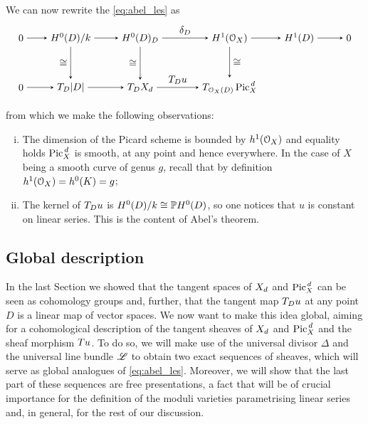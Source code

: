 		We can now rewrite the \les \eqref{eq:abel_les} as
		\begin{equation}\label{eq:local_diagram}
		\begin{tikzpicture}[node distance=5em, auto]
			\node (O) 									{$0$};
			\node (A) 	[right of=O]		{$H^0(D)/k$};
			\node (B) 	[right of=A, xshift=2em]		{$H^0(D)_D$};
		  \node (C) 	[right of=B, xshift=4em] 		{$H^1(\OX)$};
		  \node (D) 	[right of=C, xshift=2em] 		{$H^1(D)$};
		  \node (OO) 	[right of=D] 		{$0$};
		  \node (O') 	[below of=O] 		{$0$};
			\node (A') 	[below of=A] 		{$ T_D |D|$};
		  \node (B') 	[below of=B] 		{$ T_D \Dd$};
		  \node (C') 	[below of=C] 		{$ T_{\OXD} \Pd $};
		  \node (D') 	[below of=D] 		{$\;$};
			\draw[-stealth] 				(O)		to node {} (A);
		  \draw[-stealth]					(A)		to node {} (B);
		  \draw[-stealth]					(B)		to node {$\delta_D$} (C);
		  \draw[-stealth]					(C)		to node {} (D);
			\draw[-stealth]					(D)		to node {} (OO);
			\draw[-stealth] 				(O')	to node {} (A');
		  \draw[-stealth]					(A')	to node {} (B');	  
		  \draw[-stealth]					(B')	to node {$T_D u$} (C');
		  \draw[-stealth][swap]		(A)		to node {$\cong$} (A');
		  \draw[-stealth][swap]		(B)		to node {$\cong$} (B');
		  \draw[-stealth]					(C)		to node {$\cong$} (C');
		\end{tikzpicture}
		\end{equation}	
		from which we make the following observations:
		\begin{enumerate}[i)]
			\item The dimension of the Picard scheme is bounded by $h^1(\mathcal{O}_X)$ and equality holds \ABiff $ \operatorname{Pic}^{\,d}_X$ is smooth, at any point and hence everywhere. In the case of $X$ being a smooth curve of genus $g$, recall that by definition $h^1(\mathcal{O}_X)=h^0(K)=g$;
			\item The kernel of $T_D u$ is $H^0(D)/k \cong \mathbb{P} H^0(D)$, so one notices that $u$ is constant on linear series. This is the content of Abel's theorem.
		\end{enumerate}

	\subsection{Global description}

		In the last Section we showed that the tangent spaces of $X_d$ and $\operatorname{Pic}^{\,d}_X$ can be seen as cohomology groups and, further, that the tangent map $T_D u$ at any point $D$ is a linear map of vector spaces. 
		We now want to make this idea global, aiming for a cohomological description of the tangent sheaves of $X_d$ and $\operatorname{Pic}^{\,d}_X$ and the sheaf morphism $Tu$. 
		To do so, we will make use of the universal divisor $\Delta$ and the universal line bundle $\mathscr{L}$ to obtain two exact sequences of sheaves, which will serve as global analogues of \eqref{eq:abel_les}. 
		Moreover, we will show that the last part of these sequences are free presentations, a fact that will be of crucial importance for the definition of the moduli varieties parametrising linear series and, in general, for the rest of our discussion.\\


